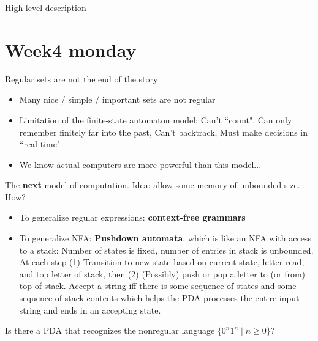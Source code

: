 \documentclass[12pt, oneside]{article}
\begin{document}
\vfill

High-level description

\vfill

\newpage
 \vfill
\section*{Week4 monday}


Regular sets are not the end of the story
\begin{itemize}
    \item Many nice / simple / important sets are not regular
    \item Limitation of the finite-state automaton model: Can't ``count", Can only remember finitely far into the past,
    Can't backtrack, Must make decisions in ``real-time"
    \item We know actual computers are more powerful than this model...
\end{itemize}

The {\bf next} model of computation. Idea: allow some memory of unbounded size. How? 
\begin{itemize}
    \item To generalize regular expressions: {\bf context-free grammars}\\
    \item To generalize NFA: {\bf Pushdown automata}, which is like an NFA with access to a stack: 
    Number of states is fixed, number of entries in stack is unbounded. At each step
    (1) Transition to new state based on current state, letter read, and top letter of stack, then
    (2) (Possibly) push or pop a letter to (or from) top of stack. Accept a string iff
    there is some sequence of states and some sequence of stack contents 
    which helps the PDA processes the entire input string and ends in an accepting state.
\end{itemize}

\vfill

\vfill

Is there a PDA that recognizes the nonregular language $\{0^n1^n \mid n \geq 0 \}$?

\vfill

\newpage

\end{document}
